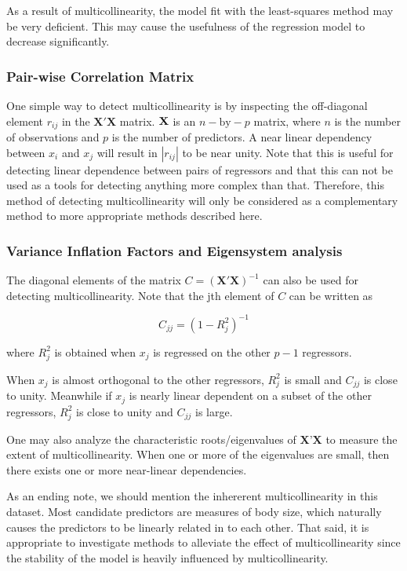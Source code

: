 \documentclass[11pt]{article}
\begin{document}
As a result of multicollinearity, the model fit with the least-squares method may be very deficient.
This may cause the usefulness of the regression model to decrease significantly. 

\subsubsection{Pair-wise Correlation Matrix}
\label{sec:org7224452}

One simple way to detect multicollinearity is by inspecting the off-diagonal element \(r_{ij}\) in the 
\(\textbf{X}' \textbf{X}\) matrix. \(\textbf X\) is an \(n-\text{by}-p\) matrix, where \(n\) is the number of observations 
and \(p\) is the number of predictors.
A near linear dependency between \(x_i\) and \(x_j\) will result in \(|r_{ij}|\) to be near unity. Note that this is
useful for detecting linear dependence between pairs of regressors and that this can not be used as a tools for
detecting anything more complex than that. Therefore, this method of detecting multicollinearity will
only be considered as a complementary method to more appropriate methods described here.

\subsubsection{Variance Inflation Factors and Eigensystem analysis}
\label{sec:org8ac5c1f}

The diagonal elements of the matrix \(C = (\textbf{X}' \textbf{X})^{-1}\) can also be used for detecting multicollinearity. Note that 
the jth element of \(C\) can be written as

\[
   C_{jj}=(1-R_j^2)^{-1}
   \]

where \(R_j^2\) is obtained when \(x_j\) is regressed on the other \(p-1\) regressors.

When \(x_j\) is almost orthogonal to the other regressors, \(R_j^2\) is small and \(C_{jj}\) is close to unity. Meanwhile 
if \(x_j\) is nearly linear dependent on a subset of the other regressors, \(R^2_j\) is close to unity and \(C_{jj}\)
is large.

One may also analyze the characteristic roots/eigenvalues of \(\textbf{X}’\textbf{X}\) to measure the extent of
multicollinearity. When one or more of the eigenvalues are small, then there exists one or more near-linear
dependencies. 

As an ending note, we should mention the inhererent multicollinearity in this dataset. Most candidate predictors 
are measures of body size, which naturally causes the predictors to be linearly related in to each other. That 
said, it is appropriate to investigate methods to alleviate the effect of multicollinearity since 
the stability of the model is heavily influenced by multicollinearity.
\end{document}
